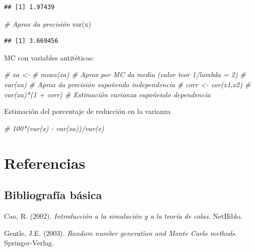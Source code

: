\documentclass[
]{book}
\newenvironment{Shaded}{\begin{snugshade}}{\end{snugshade}}
\newcommand{\CommentTok}[1]{\textcolor[rgb]{0.56,0.35,0.01}{\textit{#1}}}
\newcommand{\FunctionTok}[1]{\textcolor[rgb]{0.00,0.00,0.00}{#1}}
\newcommand{\NormalTok}[1]{#1}
\theoremstyle{break}
\theoremstyle{definition}
\theoremstyle{definition}
\theoremstyle{definition}
\theoremstyle{definition}
\theoremstyle{remark}
\begin{document}
\begin{verbatim}
## [1] 1.97439
\end{verbatim}

\begin{Shaded}
\begin{Highlighting}[]
\CommentTok{\# Aprox da precisión }
\FunctionTok{var}\NormalTok{(x)  }
\end{Highlighting}
\end{Shaded}

\begin{verbatim}
## [1] 3.669456
\end{verbatim}

MC con variables antitéticas:

\begin{Shaded}
\begin{Highlighting}[]
\CommentTok{\# xa \textless{}{-}}
\CommentTok{\# mean(xa) \# Aprox por MC da media (valor teor 1/lambda = 2)}
\CommentTok{\# var(xa)  \# Aprox da precisión supoñendo independencia}
\CommentTok{\# corr \textless{}{-} cor(x1,x2)}
\CommentTok{\# var(xa)*(1 + corr) \# Estimación varianza supoñendo dependencia}
\end{Highlighting}
\end{Shaded}

Estimación del porcentaje de reducción en la varianza

\begin{Shaded}
\begin{Highlighting}[]
\CommentTok{\# 100*(var(x) {-} var(xa))/var(x)}
\end{Highlighting}
\end{Shaded}

\hypertarget{referencias}{%
\chapter*{Referencias}\label{referencias}}

\hypertarget{bibliografuxeda-buxe1sica}{%
\section*{Bibliografía básica}\label{bibliografuxeda-buxe1sica}}

Cao, R. (2002). \emph{Introducción a la simulación y a la teoría de colas}. NetBiblo.

Gentle, J.E. (2003). \emph{Random number generation and Monte Carlo methods}. Springer‐Verlag.
\end{document}
